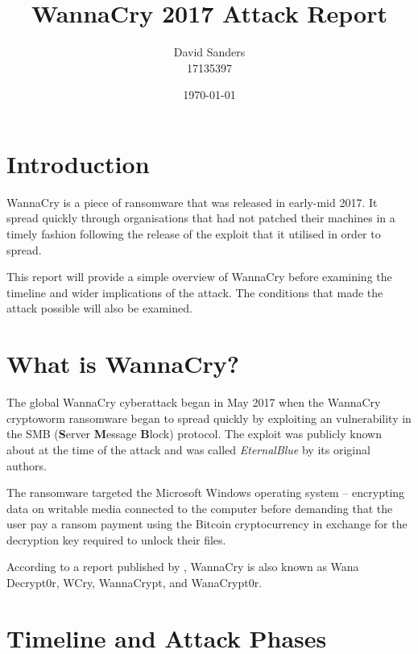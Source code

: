\documentclass[12pt]{article}
\title{WannaCry 2017 Attack Report}
\author{David Sanders\\17135397}
\date{\today}
\begin{document}
\maketitle
\tableofcontents
\pagebreak


\section{Introduction}
WannaCry is a piece of ransomware that was released in early-mid 2017. It spread quickly through organisations that had not patched their machines in a timely fashion following the release of the exploit that it utilised in order to spread.

This report will provide a simple overview of WannaCry before examining the timeline and wider implications of the attack. The conditions that made the attack possible will also be examined.


\section{What is WannaCry?}
The global WannaCry cyberattack began in May 2017 when the WannaCry cryptoworm ransomware began to spread quickly by exploiting an vulnerability in the SMB (\textbf{S}erver \textbf{M}essage \textbf{B}lock) protocol. The exploit was publicly known about at the time of the attack and was called \textit{EternalBlue} by its original authors.

The ransomware targeted the Microsoft Windows operating system -- encrypting data on writable media connected to the computer before demanding that the user pay a ransom payment using the Bitcoin cryptocurrency in exchange for the decryption key required to unlock their files.

According to a report published by \citet{pdf:CERT-LT:WannaCry-Ransomware-Report-v1.0:20170615}, WannaCry is also known as Wana Decrypt0r, WCry, WannaCrypt, and WanaCrypt0r.


\section{Timeline and Attack Phases}
\end{document}
